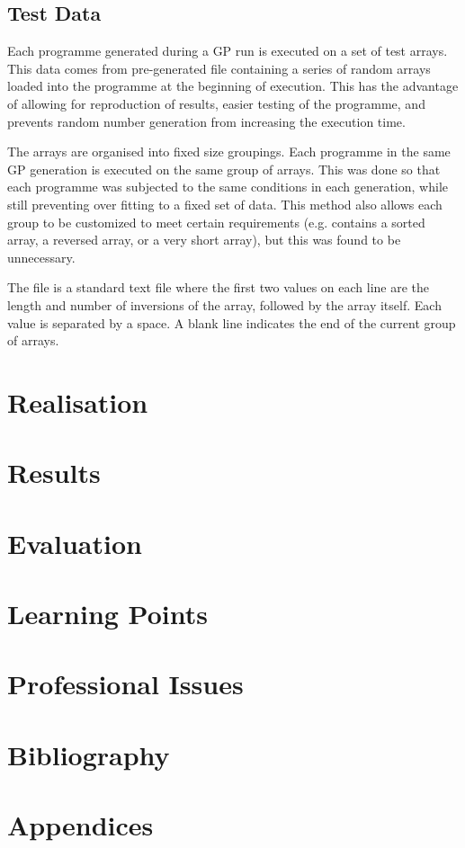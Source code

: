 \documentclass{article}
\begin{document}
		\subsection{Test Data}
		
			Each programme generated during a GP run is executed on a set of test arrays. This data comes from pre-generated file containing a series of random arrays loaded into the programme at the beginning of execution. This has the advantage of allowing for reproduction of results, easier testing of the programme, and prevents random number generation from increasing the execution time.
			
			The arrays are organised into fixed size groupings. Each programme in the same GP generation is executed on the same group of arrays. This was done so that each programme was subjected to the same conditions in each generation, while still preventing over fitting to a fixed set of data. This method also allows each group to be customized to meet certain requirements (e.g. contains a sorted array, a reversed array, or a very short array), but this was found to be unnecessary.
			
			The file is a standard text file where the first two values on each line are the length and number of inversions of the array, followed by the array itself. Each value is separated by a space. A blank line indicates the end of the current group of arrays.
	
	\section{Realisation}
	
	\section{Results}
	
	
	
	\section{Evaluation}
	
	\section{Learning Points}
	
	\section{Professional Issues}
	
	\section{Bibliography}
	
		
		
	
	\section{Appendices}
		
\end{document}
